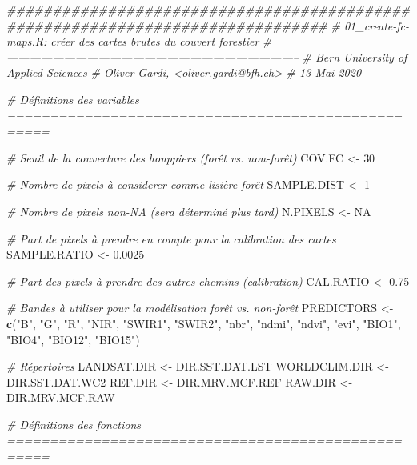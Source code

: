 \documentclass[a4paper, notitlepage, 12pt, krantz2]{krantz}
\newenvironment{Shaded}{\begin{snugshade}}{\end{snugshade}}
\newcommand{\CommentTok}[1]{\textcolor[rgb]{0.56,0.35,0.01}{\textit{#1}}}
\newcommand{\DecValTok}[1]{\textcolor[rgb]{0.00,0.00,0.81}{#1}}
\newcommand{\FloatTok}[1]{\textcolor[rgb]{0.00,0.00,0.81}{#1}}
\newcommand{\KeywordTok}[1]{\textcolor[rgb]{0.13,0.29,0.53}{\textbf{#1}}}
\newcommand{\NormalTok}[1]{#1}
\newcommand{\OtherTok}[1]{\textcolor[rgb]{0.56,0.35,0.01}{#1}}
\newcommand{\StringTok}[1]{\textcolor[rgb]{0.31,0.60,0.02}{#1}}
\begin{document}
\begin{Shaded}
\begin{Highlighting}[]
\CommentTok{###############################################################################}
\CommentTok{# 01_create-fc-maps.R: créer des cartes brutes du couvert forestier}
\CommentTok{# -----------------------------------------------------------------------------}
\CommentTok{# Bern University of Applied Sciences}
\CommentTok{# Oliver Gardi, <oliver.gardi@bfh.ch>}
\CommentTok{# 13 Mai 2020}

\CommentTok{# Définitions des variables ===================================================}

\CommentTok{# Seuil de la couverture des houppiers (forêt vs. non-forêt)}
\NormalTok{COV.FC         <-}\StringTok{ }\DecValTok{30}             

\CommentTok{# Nombre de pixels à considerer comme lisière forêt }
\NormalTok{SAMPLE.DIST    <-}\StringTok{ }\DecValTok{1}              

\CommentTok{# Nombre de pixels non-NA (sera déterminé plus tard)}
\NormalTok{N.PIXELS       <-}\StringTok{ }\OtherTok{NA}        

\CommentTok{# Part de pixels à prendre en compte pour la calibration des cartes}
\NormalTok{SAMPLE.RATIO   <-}\StringTok{ }\FloatTok{0.0025}        

\CommentTok{# Part des pixels à prendre des autres chemins (calibration)}
\NormalTok{CAL.RATIO      <-}\StringTok{ }\FloatTok{0.75} 

\CommentTok{# Bandes à utiliser pour la modélisation forêt vs. non-forêt}
\NormalTok{PREDICTORS     <-}\StringTok{ }\KeywordTok{c}\NormalTok{(}\StringTok{"B"}\NormalTok{, }\StringTok{"G"}\NormalTok{, }\StringTok{"R"}\NormalTok{, }\StringTok{"NIR"}\NormalTok{, }\StringTok{"SWIR1"}\NormalTok{, }\StringTok{"SWIR2"}\NormalTok{, }
                    \StringTok{"nbr"}\NormalTok{, }\StringTok{"ndmi"}\NormalTok{, }\StringTok{"ndvi"}\NormalTok{, }\StringTok{"evi"}\NormalTok{, }
                    \StringTok{"BIO1"}\NormalTok{, }\StringTok{"BIO4"}\NormalTok{, }\StringTok{"BIO12"}\NormalTok{, }\StringTok{"BIO15"}\NormalTok{) }

\CommentTok{# Répertoires}
\NormalTok{LANDSAT.DIR <-}\StringTok{ }\NormalTok{DIR.SST.DAT.LST}
\NormalTok{WORLDCLIM.DIR <-}\StringTok{ }\NormalTok{DIR.SST.DAT.WC2}
\NormalTok{REF.DIR <-}\StringTok{ }\NormalTok{DIR.MRV.MCF.REF}
\NormalTok{RAW.DIR <-}\StringTok{ }\NormalTok{DIR.MRV.MCF.RAW}
  

\CommentTok{# Définitions des fonctions ===================================================}


\end{Highlighting}
\end{Shaded}
\end{document}
